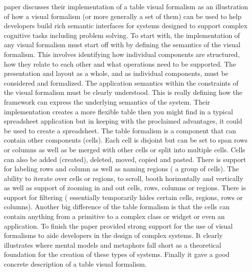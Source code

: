 \documentclass{sig-alternate}
\begin{document}
  paper discusses their implementation of a table visual formalism as an
  illustration of how a visual formalism (or more generally a set of them) can
  be used to help developers build rich semantic interfaces for systems designed
  to support complex cognitive tasks including
problem solving. To start with, the implementation of any visual formalism must
start off with by defining the semantics of the visual formalism. This involves
identifying how individual components are structured, how they relate to each
other and what operations need to be supported. The presentation and layout as a
whole, and as individual components, must be considered and formalized. The
application semantics within the constraints of the visual formalism must be
clearly understood. This is really defining how the framework can express the
underlying semantics of the system. Their implementation creates a more flexible
table then you might find in a typical spreadsheet application but in keeping
with the proclaimed advantages, it could be used to create a
  spreadsheet. The table formalism is a component that can contain other
components (cells). Each cell is disjoint but can be set to span rows or columns
as well as be merged with other cells or split into multiple cells. Cells can
also be added (created), deleted, moved, copied and pasted. There is support for
labeling rows and column as well as naming regions ( a group of cells). The
ability to iterate over cells or regions, to scroll, booth horizontally and
vertically as well as support of zooming in and out cells, rows, columns or
regions. There is support for filtering ( essentially temporarily hides certain
cells, regions, rows or columns). Another big difference of the table formalism
is that the cells can contain anything from a primitive to a complex class or
widget or even an application. To finish the paper provided strong support for
the use of visual formalisms to aide developers in the design of complex
systems. It clearly illustrates where mental models and metaphors fall short as
a theoretical foundation for the creation of these types of systems. Finally it
gave a good concrete description of a table visual formalism.
\end{document}
